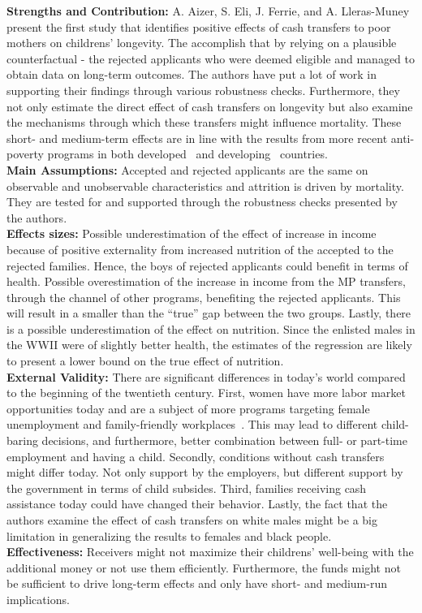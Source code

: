 \textbf{Strengths and Contribution:} A. Aizer, S. Eli, J. Ferrie, and A. Lleras-Muney present the first study that identifies positive effects of cash transfers to poor mothers on childrens' longevity. The accomplish that by relying on a plausible counterfactual - the rejected applicants who were deemed eligible and managed to obtain data on long-term outcomes. The authors have put a lot of work in supporting their findings through various robustness checks. Furthermore, they not only estimate the direct effect of cash transfers on longevity but also examine the mechanisms through which these transfers might influence mortality. These short- and medium-term effects are in line with the results from more recent anti-poverty programs in both developed~ and developing~\citep{barham2011healthier, barham2013living} countries.\\
\textbf{Main Assumptions:} Accepted and rejected applicants are the same on observable and unobservable characteristics and attrition is driven by mortality. They are tested for and supported through the robustness checks presented by the authors.   \\
\textbf{Effects sizes:} Possible underestimation of the effect of increase in income because of positive
externality from increased nutrition of the accepted to the rejected families. Hence, the boys of rejected applicants could benefit in terms of health. Possible overestimation of the increase in income from the MP transfers, through the channel of other programs, benefiting the rejected applicants. This will result in a smaller than the ``true'' gap between the two groups. Lastly, there is a possible underestimation of the effect on nutrition. Since the enlisted males in the WWII were of slightly better health, the estimates of the regression are likely to present a lower bound on the true effect of nutrition. \\
\textbf{External Validity:} There are significant differences in today's world compared to the beginning of the twentieth century. First, women have more labor market opportunities today and are a subject of more programs targeting female unemployment and family-friendly workplaces~\citep{lauber2016helping}. This may lead to different child-baring decisions, and furthermore, better combination between full- or part-time employment and having a child. Secondly, conditions without cash transfers might differ today. Not only support by the employers, but different support by the government in terms of child subsides. Third, families receiving cash assistance today could have changed their behavior. Lastly, the fact that the authors examine the effect of cash transfers on white males might be a big limitation in generalizing the results to females and black people.\\   
\textbf{Effectiveness:} Receivers might not maximize their childrens' well-being with the additional money or not use them efficiently. Furthermore, the funds might not be sufficient to drive long-term effects and only have short- and medium-run implications. 